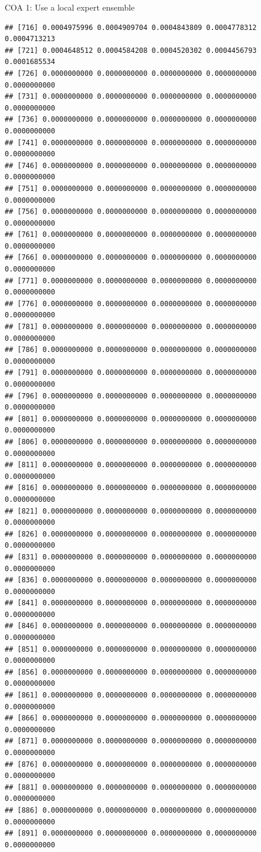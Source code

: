 \documentclass[ignorenonframetext,]{beamer}
\begin{document}
\begin{frame}[fragile]{COA 1: Use a local expert ensemble}
\begin{verbatim}
## [716] 0.0004975996 0.0004909704 0.0004843809 0.0004778312 0.0004713213
## [721] 0.0004648512 0.0004584208 0.0004520302 0.0004456793 0.0001685534
## [726] 0.0000000000 0.0000000000 0.0000000000 0.0000000000 0.0000000000
## [731] 0.0000000000 0.0000000000 0.0000000000 0.0000000000 0.0000000000
## [736] 0.0000000000 0.0000000000 0.0000000000 0.0000000000 0.0000000000
## [741] 0.0000000000 0.0000000000 0.0000000000 0.0000000000 0.0000000000
## [746] 0.0000000000 0.0000000000 0.0000000000 0.0000000000 0.0000000000
## [751] 0.0000000000 0.0000000000 0.0000000000 0.0000000000 0.0000000000
## [756] 0.0000000000 0.0000000000 0.0000000000 0.0000000000 0.0000000000
## [761] 0.0000000000 0.0000000000 0.0000000000 0.0000000000 0.0000000000
## [766] 0.0000000000 0.0000000000 0.0000000000 0.0000000000 0.0000000000
## [771] 0.0000000000 0.0000000000 0.0000000000 0.0000000000 0.0000000000
## [776] 0.0000000000 0.0000000000 0.0000000000 0.0000000000 0.0000000000
## [781] 0.0000000000 0.0000000000 0.0000000000 0.0000000000 0.0000000000
## [786] 0.0000000000 0.0000000000 0.0000000000 0.0000000000 0.0000000000
## [791] 0.0000000000 0.0000000000 0.0000000000 0.0000000000 0.0000000000
## [796] 0.0000000000 0.0000000000 0.0000000000 0.0000000000 0.0000000000
## [801] 0.0000000000 0.0000000000 0.0000000000 0.0000000000 0.0000000000
## [806] 0.0000000000 0.0000000000 0.0000000000 0.0000000000 0.0000000000
## [811] 0.0000000000 0.0000000000 0.0000000000 0.0000000000 0.0000000000
## [816] 0.0000000000 0.0000000000 0.0000000000 0.0000000000 0.0000000000
## [821] 0.0000000000 0.0000000000 0.0000000000 0.0000000000 0.0000000000
## [826] 0.0000000000 0.0000000000 0.0000000000 0.0000000000 0.0000000000
## [831] 0.0000000000 0.0000000000 0.0000000000 0.0000000000 0.0000000000
## [836] 0.0000000000 0.0000000000 0.0000000000 0.0000000000 0.0000000000
## [841] 0.0000000000 0.0000000000 0.0000000000 0.0000000000 0.0000000000
## [846] 0.0000000000 0.0000000000 0.0000000000 0.0000000000 0.0000000000
## [851] 0.0000000000 0.0000000000 0.0000000000 0.0000000000 0.0000000000
## [856] 0.0000000000 0.0000000000 0.0000000000 0.0000000000 0.0000000000
## [861] 0.0000000000 0.0000000000 0.0000000000 0.0000000000 0.0000000000
## [866] 0.0000000000 0.0000000000 0.0000000000 0.0000000000 0.0000000000
## [871] 0.0000000000 0.0000000000 0.0000000000 0.0000000000 0.0000000000
## [876] 0.0000000000 0.0000000000 0.0000000000 0.0000000000 0.0000000000
## [881] 0.0000000000 0.0000000000 0.0000000000 0.0000000000 0.0000000000
## [886] 0.0000000000 0.0000000000 0.0000000000 0.0000000000 0.0000000000
## [891] 0.0000000000 0.0000000000 0.0000000000 0.0000000000 0.0000000000

\end{verbatim}
\end{frame}
\end{document}
